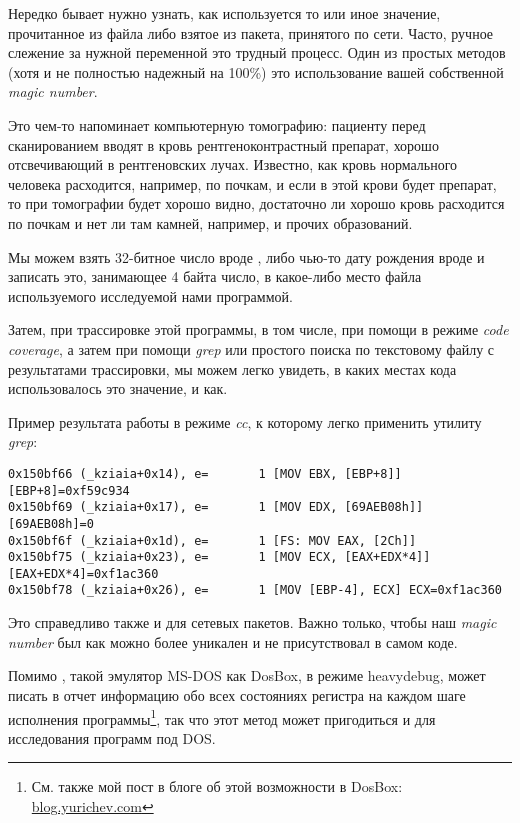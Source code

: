 
Нередко бывает нужно узнать, как используется то или иное значение, прочитанное из файла либо взятое из пакета,
принятого по сети. Часто, ручное слежение за нужной переменной это трудный процесс. Один из простых методов (хотя и не
полностью надежный на 100\%) это использование вашей собственной \emph{magic number}.

Это чем-то напоминает компьютерную томографию: пациенту перед сканированием вводят в кровь 
рентгеноконтрастный препарат, хорошо отсвечивающий в рентгеновских лучах.
Известно, как кровь нормального человека
расходится, например, по почкам, и если в этой крови будет препарат, то при томографии будет хорошо видно,
достаточно ли хорошо кровь расходится по почкам и нет ли там камней, например, и прочих образований.

Мы можем взять 32-битное число вроде , либо чью-то дату рождения вроде  
и записать это, занимающее 4 байта число, в какое-либо место файла используемого исследуемой нами программой.

\myindex{\GrepUsage}
Затем, при трассировке этой программы, в том числе, при помощи \tracer в режиме 
\emph{code coverage}, а затем при помощи
\emph{grep} или простого поиска по текстовому файлу с результатами трассировки, мы можем легко увидеть, в каких местах кода использовалось 
это значение, и как.

Пример результата работы \tracer в режиме \emph{cc}, к которому легко применить утилиту \emph{grep}:

\begin{lstlisting}[style=customasmx86]
0x150bf66 (_kziaia+0x14), e=       1 [MOV EBX, [EBP+8]] [EBP+8]=0xf59c934 
0x150bf69 (_kziaia+0x17), e=       1 [MOV EDX, [69AEB08h]] [69AEB08h]=0 
0x150bf6f (_kziaia+0x1d), e=       1 [FS: MOV EAX, [2Ch]] 
0x150bf75 (_kziaia+0x23), e=       1 [MOV ECX, [EAX+EDX*4]] [EAX+EDX*4]=0xf1ac360 
0x150bf78 (_kziaia+0x26), e=       1 [MOV [EBP-4], ECX] ECX=0xf1ac360 
\end{lstlisting}
Это справедливо также и для сетевых пакетов.
Важно только, чтобы наш \emph{magic number} был как можно более уникален и не присутствовал в самом коде.

\newcommand{\DOSBOXURL}{\href{http://go.yurichev.com/17222}{blog.yurichev.com}}

Помимо \tracer, такой эмулятор MS-DOS как DosBox, в режиме heavydebug, может писать в отчет информацию обо всех
состояниях регистра на каждом шаге исполнения программы\footnote{См. также мой пост в блоге об этой возможности в 
DosBox: \DOSBOXURL{}}, так что этот метод может пригодиться и для исследования программ под DOS.

